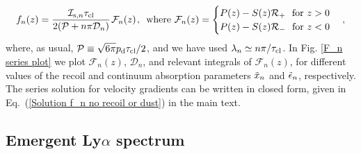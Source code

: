 \documentclass[fleqn,usenatbib]{mnras}
\newcommand{\taucl}{\tau_{\rm cl}}
\begin{document}
\begin{equation}
    f_n(z) = \dfrac{\mathcal{I}_{\textrm{s},n} \taucl}{2(\mathcal{P} + n \pi \mathcal{D}_n)} \hspace{1 pt} \mathcal{F}_n(z) \hspace{1 pt} , \hspace{5 pt} \textrm{where } \mathcal{F}_n(z) = \begin{cases}
        P(z) - S(z) \mathcal{R}_+ ~~ \textrm{for } z > 0 \\ P(z) - S(z) \mathcal{R}_- ~~ \textrm{for } z < 0 
    \end{cases} , \label{f_n series solution final}
\end{equation}
where, as usual, $\mathcal{P} \equiv \sqrt{6 \pi} p_{\rm d} \taucl/2$, and we have used $\lambda_n \simeq n\pi/\taucl$. In Fig. \ref{F_n series plot} we plot $\mathcal{F}_n(z)$, $\mathcal{D}_n$, and relevant integrals of $\mathcal{F}_n(z)$, for different values of the recoil and continuum absorption parameters $\Tilde{x}_n$ and $\Tilde{\epsilon}_n$, respectively. The series solution for velocity gradients can be written in closed form, given in Eq.~(\ref{Solution f_n no recoil or dust}) in the main text.


\subsection{Emergent Ly\texorpdfstring{\boldmath$\alpha$}{alpha} spectrum}
\label{AppendixSpectrum}
\end{document}
